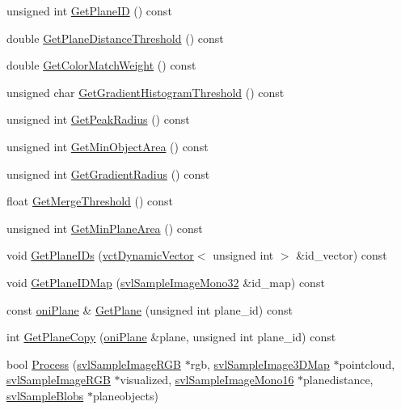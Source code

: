 \begin{DoxyCompactItemize}
\item 
unsigned int \hyperlink{classoni_plane_segmentation_a77df8f8ea6702c4bd91b90462f3ba676}{Get\+Plane\+I\+D} () const 
\item 
double \hyperlink{classoni_plane_segmentation_a0ee73bd8d537cb67dc763fb7634a8ddb}{Get\+Plane\+Distance\+Threshold} () const 
\item 
double \hyperlink{classoni_plane_segmentation_aee5548fe14064ad19eda72cc0e0bd901}{Get\+Color\+Match\+Weight} () const 
\item 
unsigned char \hyperlink{classoni_plane_segmentation_adec2be8920b90abdc6557c9c4884601d}{Get\+Gradient\+Histogram\+Threshold} () const 
\item 
unsigned int \hyperlink{classoni_plane_segmentation_a35015761155ea15da524ac29c2f082d7}{Get\+Peak\+Radius} () const 
\item 
unsigned int \hyperlink{classoni_plane_segmentation_af470c18810d8fe86992f269c5c9abd5b}{Get\+Min\+Object\+Area} () const 
\item 
unsigned int \hyperlink{classoni_plane_segmentation_ad392ec1b243dd02b9729280909aae4a3}{Get\+Gradient\+Radius} () const 
\item 
float \hyperlink{classoni_plane_segmentation_a039fe6d9c39d26fd727d53f355c3c695}{Get\+Merge\+Threshold} () const 
\item 
unsigned int \hyperlink{classoni_plane_segmentation_a55c1b6224d3b69d452ef7ce0ef4bef6e}{Get\+Min\+Plane\+Area} () const 
\item 
void \hyperlink{classoni_plane_segmentation_a576defa5e03da9cd55bd04a950699f70}{Get\+Plane\+I\+Ds} (\hyperlink{classvct_dynamic_vector}{vct\+Dynamic\+Vector}$<$ unsigned int $>$ \&id\+\_\+vector) const 
\item 
void \hyperlink{classoni_plane_segmentation_ae65059a4f610673275c62becf478f173}{Get\+Plane\+I\+D\+Map} (\hyperlink{svl_sample_image_types_8h_ac5d9d107eabb65b55f67d2a70ccf2cd6}{svl\+Sample\+Image\+Mono32} \&id\+\_\+map) const 
\item 
const \hyperlink{classoni_plane}{oni\+Plane} \& \hyperlink{classoni_plane_segmentation_ae06c149b27938a8235287f42caa7c277}{Get\+Plane} (unsigned int plane\+\_\+id) const 
\item 
int \hyperlink{classoni_plane_segmentation_a1c8c319dd4a274c87e185a99922a069d}{Get\+Plane\+Copy} (\hyperlink{classoni_plane}{oni\+Plane} \&plane, unsigned int plane\+\_\+id) const 
\item 
bool \hyperlink{classoni_plane_segmentation_a9cdf5e3553c9a1df960bf5213bfde290}{Process} (\hyperlink{svl_sample_image_types_8h_a54a55112dd3879f71f990d2945375f1a}{svl\+Sample\+Image\+R\+G\+B} $\ast$rgb, \hyperlink{svl_sample_image_types_8h_a3e34d5c72fa0d2a079d24e0668358bfc}{svl\+Sample\+Image3\+D\+Map} $\ast$pointcloud, \hyperlink{svl_sample_image_types_8h_a54a55112dd3879f71f990d2945375f1a}{svl\+Sample\+Image\+R\+G\+B} $\ast$visualized, \hyperlink{svl_sample_image_types_8h_a0d4a39c480e3245d7f92d6699aa17848}{svl\+Sample\+Image\+Mono16} $\ast$planedistance, \hyperlink{classsvl_sample_blobs}{svl\+Sample\+Blobs} $\ast$planeobjects)

\end{DoxyCompactItemize}
